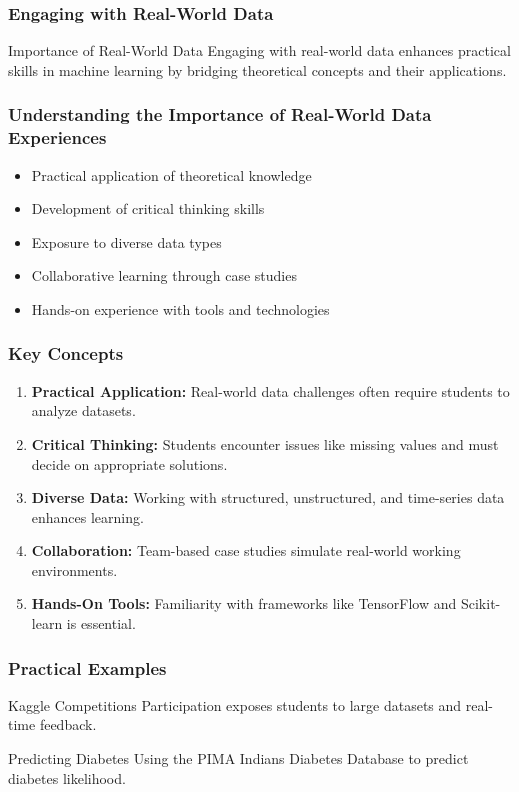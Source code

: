 \documentclass[aspectratio=169]{beamer}
\begin{document}
\begin{frame}[fragile]
    \frametitle{Engaging with Real-World Data}
    \begin{block}{Importance of Real-World Data}
        Engaging with real-world data enhances practical skills in machine learning by bridging theoretical concepts and their applications.
    \end{block}
\end{frame}

\begin{frame}[fragile]
    \frametitle{Understanding the Importance of Real-World Data Experiences}
    \begin{itemize}
        \item Practical application of theoretical knowledge
        \item Development of critical thinking skills
        \item Exposure to diverse data types
        \item Collaborative learning through case studies
        \item Hands-on experience with tools and technologies
    \end{itemize}
\end{frame}

\begin{frame}[fragile]
    \frametitle{Key Concepts}
    \begin{enumerate}
        \item \textbf{Practical Application:} 
        Real-world data challenges often require students to analyze datasets.
        \item \textbf{Critical Thinking:} 
        Students encounter issues like missing values and must decide on appropriate solutions.
        \item \textbf{Diverse Data:} 
        Working with structured, unstructured, and time-series data enhances learning.
        \item \textbf{Collaboration:} 
        Team-based case studies simulate real-world working environments.
        \item \textbf{Hands-On Tools:} 
        Familiarity with frameworks like TensorFlow and Scikit-learn is essential.
    \end{enumerate}
\end{frame}

\begin{frame}[fragile]
    \frametitle{Practical Examples}
    \begin{block}{Kaggle Competitions}
        Participation exposes students to large datasets and real-time feedback.
    \end{block}
    \begin{block}{Predicting Diabetes}
        Using the PIMA Indians Diabetes Database to predict diabetes likelihood.
    \end{block}
\end{frame}
\end{document}

